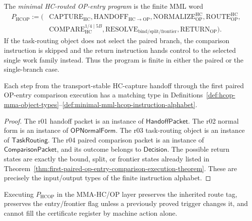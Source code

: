 \begin{definition}
\label{def:finite-hc-routed-op-entry-mml-program}
The \emph{minimal HC-routed OP-entry program} is the finite MML word
\[
\begin{aligned}
  P_{\mathrm{HCOP}}
  :=
  (&\mathrm{CAPTURE}_{\mathrm{HC}},
    \mathrm{HANDOFF}_{\mathrm{HC}\to\mathrm{OP}},
    \mathrm{NORMALIZE}_{\mathrm{OP}}^{\mathrm{HC}},
    \mathrm{ROUTE}_{\mathrm{OP}}^{\mathrm{HC}},\\
   &\mathrm{COMPARE}_{\mathrm{HC}}^{1/4\mid 5B},
    \mathrm{RESOLVE}_{\mathrm{bind/split/frontier}},
    \mathrm{RETURN}_{\mathrm{OP}}).
\end{aligned}
\]
If the task-routing object does not select the paired branch, the comparison instruction is skipped and the return instruction hands control to the selected single work family instead. Thus the program is finite in either the paired or the single-branch case.
\end{definition}

\begin{lemma}
\label{lem:typing-of-r01-r04-hc-routed-op-chain}
Each step from the transport-stable HC-capture handoff through the first paired OP-entry comparison execution has a matching type in Definitions~\ref{def:hcop-mma-object-types}--\ref{def:minimal-mml-hcop-instruction-alphabet}.
\end{lemma}

\begin{proof}
The r01 handoff packet is an instance of \(\mathsf{HandoffPacket}\). The r02 normal form is an instance of \(\mathsf{OPNormalForm}\). The r03 task-routing object is an instance of \(\mathsf{TaskRouting}\). The r04 paired comparison packet is an instance of \(\mathsf{ComparisonPacket}\), and its outcome belongs to \(\mathsf{Decision}\). The possible return states are exactly the bound, split, or frontier states already listed in Theorem~\ref{thm:first-paired-op-entry-comparison-execution-theorem}. These are precisely the input/output types of the finite instruction alphabet.
\end{proof}

\begin{lemma}
\label{lem:mml-mma-execution-preserves-route-and-frontier-discipline}
Executing \(P_{\mathrm{HCOP}}\) in the MMA-HC/OP layer preserves the inherited route tag, preserves the entry/frontier flag unless a previously proved trigger changes it, and cannot fill the certificate register by machine action alone.
\end{lemma}


